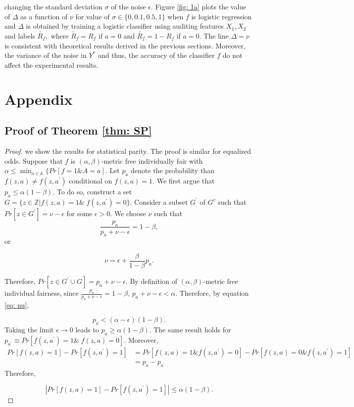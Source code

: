 \documentclass{article}
\begin{document}
changing the standard deviation $\sigma$ of the noise $\epsilon$. Figure \ref{fig: 1a} plots the value of $\Delta$ as a function of $\nu$ for value of $\sigma\in \{0, 0.1, 0.5, 1\}$ when $f$ is logistic regression and $\Delta$ is obtained by training a logistic classifier using auditing features $X_{1}, X_{2}$ and labels $\tilde{R_{f}},$ where  $\tilde{R_{f}}=R_{f}$ if $a=0$ and  $\tilde{R_{f}}=1 -R_{f}$ if $a=0$. The line $\Delta=\nu$ is consistent with theoretical results derived in the previous sections. Moreover, the variance of the noise in $Y^{*}$ and thus, the accuracy of the classifier $f$ do not affect the experimental results.

\section{Appendix}

\subsection{Proof of Theorem \ref{thm: SP}}
\begin{proof}
we show the results for statistical parity. The proof is similar for equalized odds. Suppose that $f$ is $(\alpha,\beta)$-metric free individually fair with $\alpha \leq \min_{a\in \mathbb{A}}\{Pr[f=1 \& A=a]$. Let $p_{a}$ denote the probability than $f(z, a)\neq f(z, a^{'})$ conditional on  $f(z,a)=1$. We first argue that $p_{a} \leq \alpha(1-\beta)$. To do so, construct a set $G=\{z\in \mathbb{Z}| f(z,a)= 1 \& \; f(z,a^{'})=0\}$. Consider a subset $G^{'}$ of $G^{c}$ such that $Pr[z\in G^{'}]=\nu-\epsilon$ for some $\epsilon>0$. We choose $\nu$ such that $$\frac{p_{a}}{p_{a} + \nu -\epsilon} = 1-\beta, $$
or

\begin{equation}
\label{eq: nu}
\nu = \epsilon + \frac{\beta}{1-\beta}p_{a}.    
\end{equation}

Therefore, $Pr[z\in G^{'}\cup G]=p_{a} + \nu - \epsilon$. By definition of $(\alpha, \beta)$-metric free individual fairness, since $ \frac{p_{a}}{p_{a} + \nu -\epsilon} = 1-\beta$, $p_{a} + \nu -\epsilon < \alpha$. Therefore, by equation \eqref{eq: nu},

$$  p_{a} < (\alpha - \epsilon)(1-\beta).$$ Taking the limit $\epsilon \rightarrow 0$ leads to $p_{a}\geq \alpha(1-\beta)$. The same result holds for $p_{a^{'}}\equiv Pr[f(z, a^{'})=1 \& \; f(z,a)=0]$. Moreover,
\begin{equation}
    \begin{split}
        Pr[f(z, a)=1] - Pr[f(z, a^{'})=1] & =  Pr[f(z, a)=1 \& f(z, a^{'})=0] - Pr[f(z, a)=0 \& f(z, a^{'})=1] \\
         & = p_{a} - p_{a^{'}}
    \end{split}
\end{equation}
Therefore, 

$$|Pr[f(z, a)=1] - Pr[f(z, a^{'})=1]| \leq \alpha(1-\beta). $$
\end{proof}


\end{document}
